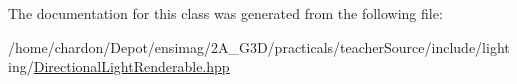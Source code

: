 The documentation for this class was generated from the following file\+:\begin{DoxyCompactItemize}
\item 
/home/chardon/\+Depot/ensimag/2\+A\+\_\+\+G3\+D/practicals/teacher\+Source/include/lighting/\hyperlink{DirectionalLightRenderable_8hpp}{Directional\+Light\+Renderable.\+hpp}\end{DoxyCompactItemize}

